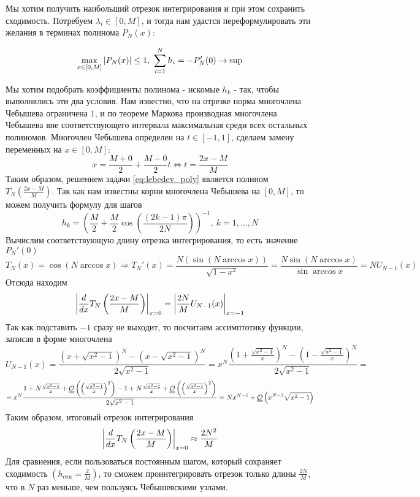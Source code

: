 Мы хотим получить наибольший отрезок интегрирования и при этом сохранить сходимость.
Потребуем $\lambda_i\in[0,M]$, и тогда нам удастся переформулировать эти желания в
терминах полинома $P_N(x)$:

\begin{equation}\label{eq:lebedev_poly}
  \max_{x\in[0,M]}\abs{P_N(x)}\leq1,\ \sum_{i=1}^{N}h_i=-P_N'(0)\rightarrow\sup
\end{equation}

Мы хотим подобрать коэффициенты полинома - искомые $h_k$ - так, чтобы выполнялись
эти два условия. Нам известно, что на отрезке норма
многочлена Чебышева ограничена $1$, и по теореме Маркова
производная многочлена Чебышева вне соответствующего интервала максимальная
среди всех остальных полиномов. Многочлен Чебышева определен на $t\in[-1,1]$,
сделаем замену переменных на $x\in[0,M]$:
\[x=\frac{M+0}{2}+\frac{M-0}{2}t\Leftrightarrow t=\frac{2x-M}{M}\]
Таким образом, решением задачи \eqref{eq:lebedev_poly} является полином $T_N(\frac{2x-M}{M})$.
Так как нам известны корни многочлена Чебышева на $[0, M]$, то можем получить формулу для шагов
\[h_k=\left(\frac{M}{2}+\frac{M}{2}\cos\left(\frac{(2k-1)\pi}{2N}\right)\right)^{-1},\ k=1,\ldots,N\]
Вычислим соответствующую длину отрезка интегрирования, то есть значение $P_N'(0)$
\[T_N(x)=\cos{(N\arccos{x})}\Rightarrow T_N'(x)=\frac{N(\sin(N\arccos{x}))}{\sqrt{1-x^2}}=\frac{N\sin(N\arccos{x})}{\sin\arccos x}=NU_{N-1}(x)\]
Отсюда находим
\[\left\lvert\frac{d}{dx}T_N\left(\frac{2x-M}{M}\right)\right\rvert_{x=0}=\left\lvert\frac{2N}{M}U_{N-1}(x)\right\rvert_{x=-1}\]
Так как подставить $-1$ сразу не выходит, то посчитаем ассимптотику функции, записав в форме многочлена
\[U_{N-1}(x)=\frac{(x+\sqrt{x^2-1})^N-(x-\sqrt{x^2-1})^N}{2\sqrt{x^2-1}}=x^N\frac{(1+\frac{\sqrt{x^2-1}}{x})^N-(1-\frac{\sqrt{x^2-1}}{x})^N}{2\sqrt{x^2-1}}=\]
\[=x^N\frac{1+N\frac{\sqrt{x^2-1}}{x}+\underline{\underline{\mathcal{O}}}\left(\left(\frac{\sqrt{x^2-1}}{x}\right)^2\right)-1+N\frac{\sqrt{x^2-1}}{x}+\underline{\underline{\mathcal{O}}}\left(\left(\frac{\sqrt{x^2-1}}{x}\right)^2\right)}{2\sqrt{x^2-1}}=Nx^{N-1}+\underline{\underline{\mathcal{O}}}\left(x^{N-2}\sqrt{x^2-1}\right)\]
Таким образом, итоговый отрезок интегрирования
\[\left\lvert\frac{d}{dx}T_N\left(\frac{2x-M}{M}\right)\right\rvert_{x=0}\approx\frac{2N^2}{M}\]
Для сравнения, если пользоваться постоянным шагом, который сохраняет сходимость $\left(h_{cou}=\frac{2}{M}\right)$,
то сможем проинтегрировать отрезок только длины $\frac{2N}{M}$, что в $N$ раз меньше, чем пользуясь Чебышевскими узлами.

